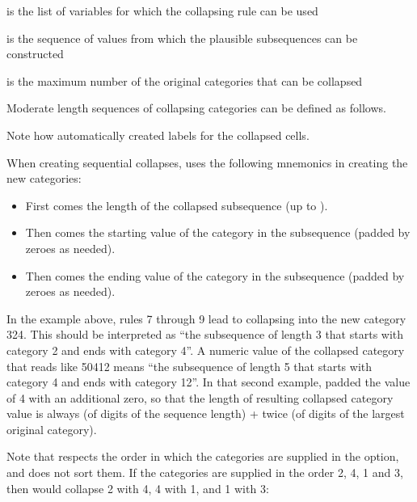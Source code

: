 
\hangpara
{} is the list of variables for which the collapsing rule can be used

\hangpara
{} is the sequence of values from which the plausible subsequences can be constructed

\hangpara
{} is the maximum number of the original categories that can be collapsed

Moderate length sequences of collapsing categories can be defined as follows.

\begin{stlog}
\nullskip
\end{stlog}

Note how  automatically created labels for the collapsed cells.

When creating sequential collapses,  uses the following mnemonics
in creating the new categories:
\begin{itemize}
    \item First comes the length of the collapsed subsequence (up to ).
    \item Then comes the starting value of the category in the subsequence (padded by zeroes as needed).
    \item Then comes the ending value of the category in the subsequence (padded by zeroes as needed).
\end{itemize}

In the example above, rules 7 through 9 lead to collapsing into the new category 324. This
should be interpreted as ``the subsequence of length 3 that starts with category 2 and ends with category 4''.
A numeric value of the collapsed category that reads like 50412 means
``the subsequence of length 5 that starts with category 4 and ends with category 12''.
In that second example,  padded the value of 4 with an additional zero,
so that the length of resulting collapsed category value is always (\stnum of digits of the sequence length) +
twice (\stnum of digits of the largest original category).

Note that  respects the order in which the categories are
supplied in the  option, and does not sort them. If the categories are supplied 
in the order 2, 4, 1 and 3, then  would collapse 2 with 4, 4 with 1, 
and 1 with 3:

